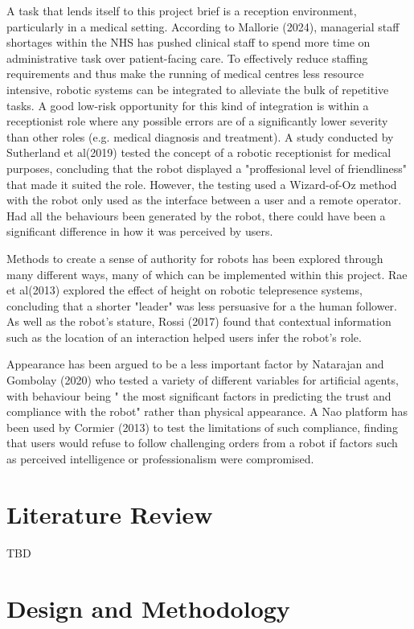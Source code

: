 \documentclass[conference]{IEEEtran}
\begin{document}
A task that lends itself to this project brief is a reception environment, particularly in a medical setting. According to 
Mallorie (2024), managerial staff shortages within the NHS has pushed clinical staff to spend more time on administrative task over 
patient-facing care. To effectively reduce staffing requirements and thus make the running of medical centres less resource intensive, robotic 
systems can be integrated to alleviate the bulk of repetitive tasks. A good low-risk opportunity for this kind of integration is within a 
receptionist role where any possible errors are of a significantly lower severity than other roles (e.g. medical diagnosis and treatment).
A study conducted by Sutherland et al(2019) tested the concept of a robotic receptionist for medical purposes, concluding that the robot displayed a 
"proffesional level of friendliness" that made it suited the role. However, the testing used a Wizard-of-Oz method with the robot only 
used as the interface between a user and a remote operator. Had all the behaviours been generated by the robot, there could have been 
a significant difference in how it was perceived by users.

Methods to create a sense of authority for robots has been explored through many different ways, many of which can be implemented within 
this project. Rae et al(2013) explored the effect of height on robotic telepresence systems, concluding that a shorter "leader" was less persuasive 
for a the human follower. As well as the robot's stature, Rossi (2017) found that contextual information such as the location of an interaction 
helped users infer the robot’s role.

Appearance has been argued to be a less important factor by Natarajan and Gombolay (2020) who tested a variety of different variables for artificial agents, with 
behaviour being " the most significant factors in predicting the trust and compliance with the robot" rather 
than physical appearance. A Nao platform has been used by Cormier (2013) to test the limitations of such compliance, finding that users would 
refuse to follow challenging orders from a robot if factors such as perceived intelligence or professionalism were compromised.


\section{Literature Review}

TBD

\section{Design and Methodology}
\end{document}
